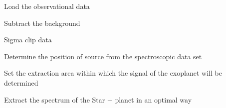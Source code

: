 \documentclass[a4paper,10pt,english]{sphinxmanual}
\begin{document}
Load the observational data

%
\begin{sphinxVerbatim}[commandchars=\\\{\}]
\end{sphinxVerbatim}

Subtract the background

%
\begin{sphinxVerbatim}[commandchars=\\\{\}]
\end{sphinxVerbatim}

Sigma clip data

%
\begin{sphinxVerbatim}[commandchars=\\\{\}]
\end{sphinxVerbatim}

Determine the position of source from the spectroscopic data set

%
\begin{sphinxVerbatim}[commandchars=\\\{\}]
\end{sphinxVerbatim}

Set the extraction area within which the signal of the exoplanet will be determined

%
\begin{sphinxVerbatim}[commandchars=\\\{\}]
\end{sphinxVerbatim}

Extract the spectrum of the Star + planet in an optimal way

%
\begin{sphinxVerbatim}[commandchars=\\\{\}]
\end{sphinxVerbatim}
\end{document}
